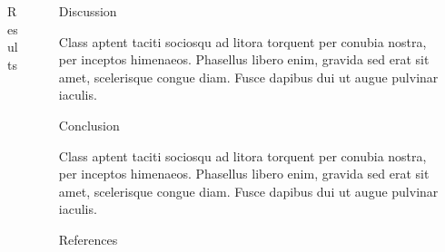 \documentclass[final]{beamer}
\newlength{\sepwidth}
\newlength{\colwidth}
\newcommand{\separatorcolumn}{\begin{column}{\sepwidth}\end{column}}
\begin{document}
\begin{frame}[t]
\begin{columns}[t]
\begin{column}{\colwidth}
\begin{block}{Results}
        \end{block}

      \end{column}

      \separatorcolumn

      \begin{column}{\colwidth}

        \begin{block}{Discussion}

          Class aptent taciti sociosqu ad litora torquent per conubia nostra, per
          inceptos himenaeos. Phasellus libero enim, gravida sed erat sit amet,
          scelerisque congue diam. Fusce dapibus dui ut augue pulvinar iaculis.

        \end{block}

        \begin{block}{Conclusion}

          Class aptent taciti sociosqu ad litora torquent per conubia nostra, per
          inceptos himenaeos. Phasellus libero enim, gravida sed erat sit amet,
          scelerisque congue diam. Fusce dapibus dui ut augue pulvinar iaculis.

        \end{block}

        \begin{block}{References}

          \nocite{*}
          \footnotesize{}

        \end{block}  
      \end{column}

      \separatorcolumn
    \end{columns}
  \end{frame}
\end{document}
